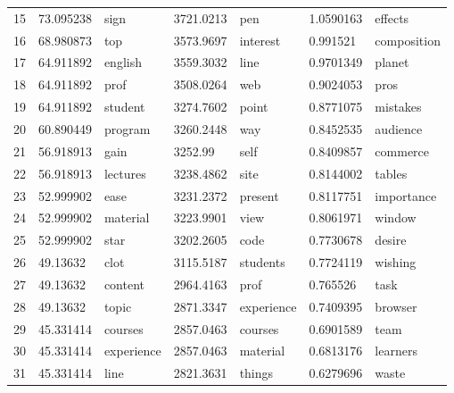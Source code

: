 \documentclass[
	a4paper,
	pdftex,
	12pt,	
	footinclude=true,
	fleqn,
	final,
	]{report}%
\begin{document}
\begin{table}[]
{\begin{tabular}{l|ll|ll|ll}
15 & 73.095238       & sign             & 3721.0213           & pen              & 1.0590163  & effects          \\
16 & 68.980873       & top              & 3573.9697           & interest         & 0.991521   & composition      \\
17 & 64.911892       & english          & 3559.3032           & line             & 0.9701349  & planet           \\
18 & 64.911892       & prof             & 3508.0264           & web              & 0.9024053  & pros             \\
19 & 64.911892       & student          & 3274.7602           & point            & 0.8771075  & mistakes         \\
20 & 60.890449       & program          & 3260.2448           & way              & 0.8452535  & audience         \\
21 & 56.918913       & gain             & 3252.99             & self             & 0.8409857  & commerce         \\
22 & 56.918913       & lectures         & 3238.4862           & site             & 0.8144002  & tables           \\
23 & 52.999902       & ease             & 3231.2372           & present          & 0.8117751  & importance       \\
24 & 52.999902       & material         & 3223.9901           & view             & 0.8061971  & window           \\
25 & 52.999902       & star             & 3202.2605           & code             & 0.7730678  & desire           \\
26 & 49.13632        & clot             & 3115.5187           & students         & 0.7724119  & wishing          \\
27 & 49.13632        & content          & 2964.4163           & prof             & 0.765526   & task             \\
28 & 49.13632        & topic            & 2871.3347           & experience       & 0.7409395  & browser          \\
29 & 45.331414       & courses          & 2857.0463           & courses          & 0.6901589  & team             \\
30 & 45.331414       & experience       & 2857.0463           & material         & 0.6813176  & learners         \\
31 & 45.331414       & line             & 2821.3631           & things           & 0.6279696  & waste            \\

\end{tabular}}
\end{table}
\end{document}

